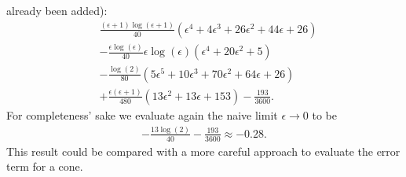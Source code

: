 already been added):
\begin{align}
  &\frac{(\epsilon + 1)\log(\epsilon + 1)}{40}
  (\epsilon^4 + 4\epsilon^3 + 26\epsilon^2 + 44\epsilon + 26) \\
  &-
  \frac{\epsilon\log(\epsilon)}{40}
    \epsilon\log(\epsilon)(\epsilon^4 + 20\epsilon^2 + 5) \\
    &-
  \frac{\log(2)}{80}(5\epsilon^5 + 10\epsilon^3 + 70\epsilon^2 + 64\epsilon+26)
  \\
  &+ \frac{\epsilon(\epsilon+1)}{480}(13\epsilon^2 + 13\epsilon + 153)
  -\frac{193}{3600}.
\end{align}
For completeness' sake we evaluate again the naive limit $\epsilon\to0$ to be
\begin{align*}
  -\frac{13\log(2)}{40}-\frac{193}{3600} \approx -0.28.
\end{align*}
This result could be compared with a more careful approach to evaluate the error
term for a cone.
